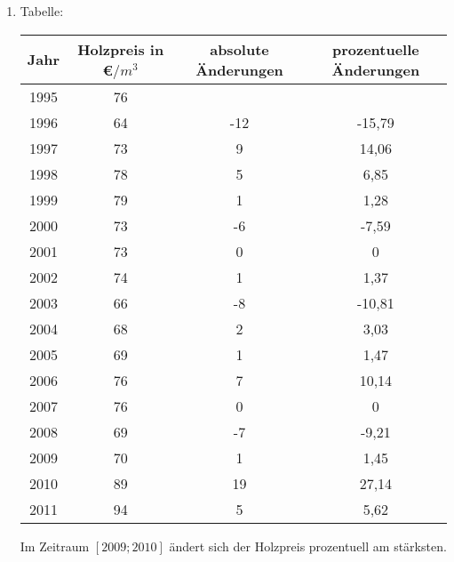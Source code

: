 \begin{langesbeispiel}
{\begin{enumerate}
Der Wert des Parameters $a$ muss negativ sein, weil der Graph der Modellfunktion eine nach unten geöffnete Parabel ist.

Prognosewert für das Jahr 2012:\\
$P(3)=85\,$\euro$/m^3$

\item Tabelle:

\begin{tabular}{|c|c|c|c|}\hline
Jahr&Holzpreis in \euro$/m^3$&absolute Änderungen&prozentuelle Änderungen\\ \hline
1995&76& & \\ \hline
1996&64&-12&-15,79\\ \hline
1997&73&9&14,06\\ \hline
1998&78&5&6,85\\ \hline
1999&79&1&1,28\\ \hline
2000&73&-6&-7,59\\ \hline
2001&73&0&0\\ \hline
2002&74&1&1,37\\ \hline
2003&66&-8&-10,81\\ \hline
2004&68&2&3,03\\ \hline
2005&69&1&1,47\\ \hline
2006&76&7&10,14\\ \hline
2007&76&0&0\\ \hline
2008&69&-7&-9,21\\ \hline
2009&70&1&1,45\\ \hline
2010&89&19&27,14\\ \hline
2011&94&5&5,62\\ \hline
\end{tabular}\leer

Im Zeitraum $[2009; 2010]$ ändert sich der Holzpreis prozentuell am stärksten.
	\end{enumerate}}
		\end{langesbeispiel}